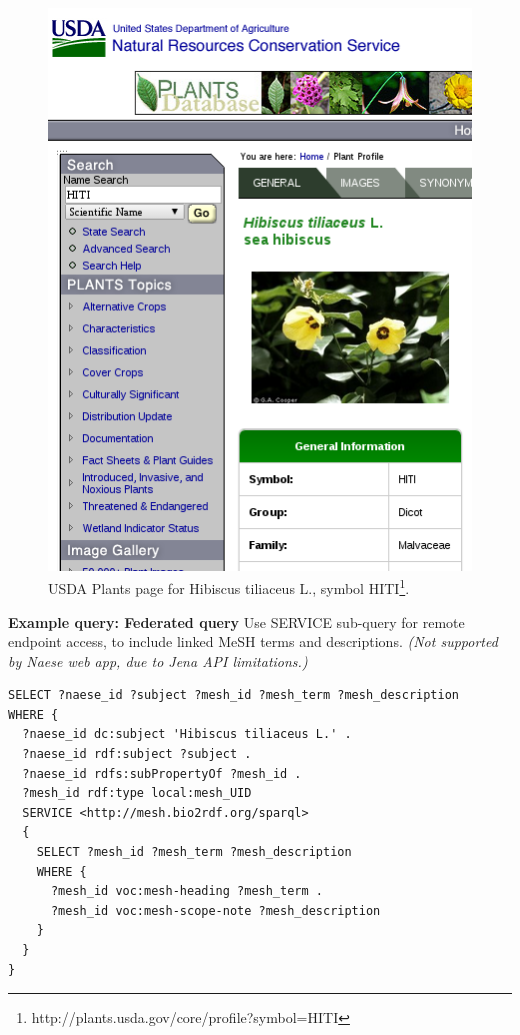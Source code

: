 \documentclass{acm_proc_article-sp}
\begin{document}
\begin{figure}[h]
\centering
\includegraphics[width=1.0\linewidth]{USDA_Plants_HITI}
\caption[USDA Plants: HITI]{USDA Plants page for Hibiscus tiliaceus L., symbol HITI\footnote{http://plants.usda.gov/core/profile?symbol=HITI}.}
\label{fig:USDA_Plants_HITI}
\end{figure}


\textbf{Example query: Federated query}
Use SERVICE sub-query for remote endpoint access, to include linked MeSH terms and descriptions. \textit{(Not supported by Naese web app, due to Jena API limitations.)}
\begin{lstlisting}
SELECT ?naese_id ?subject ?mesh_id ?mesh_term ?mesh_description
WHERE {  
  ?naese_id dc:subject 'Hibiscus tiliaceus L.' .
  ?naese_id rdf:subject ?subject . 
  ?naese_id rdfs:subPropertyOf ?mesh_id .
  ?mesh_id rdf:type local:mesh_UID
  SERVICE <http://mesh.bio2rdf.org/sparql>
  {
    SELECT ?mesh_id ?mesh_term ?mesh_description
    WHERE {
      ?mesh_id voc:mesh-heading ?mesh_term . 
      ?mesh_id voc:mesh-scope-note ?mesh_description
    }
  }
}
\end{lstlisting}
\end{document}
